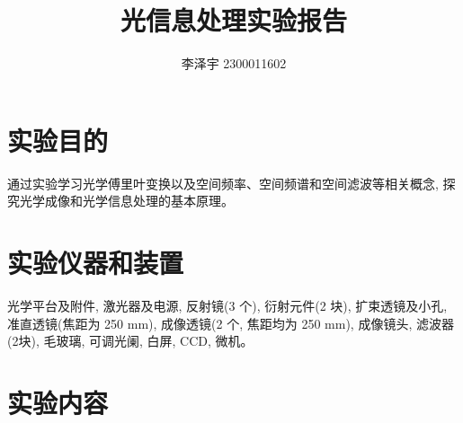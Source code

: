\documentclass[12pt]{article}
\numberwithin{equation}{section}
\numberwithin{figure}{section}
\begin{document}
\title{光信息处理实验报告}
\author{李泽宇 2300011602}
\date{}
\maketitle

\section{实验目的}

通过实验学习光学傅里叶变换以及空间频率、空间频谱和空间滤波等相关概念, 探究光学成像和光学信息处理的基本原理。

\section{实验仪器和装置}

光学平台及附件, 激光器及电源, 反射镜(3 个), 衍射元件(2 块), 扩束透镜及小孔, 
准直透镜(焦距为 250 mm), 成像透镜(2 个, 焦距均为 250 mm), 成像镜头, 滤波器(2块), 毛玻璃, 可调光阑, 白屏, CCD, 微机。

\section{实验内容}
\end{document}
